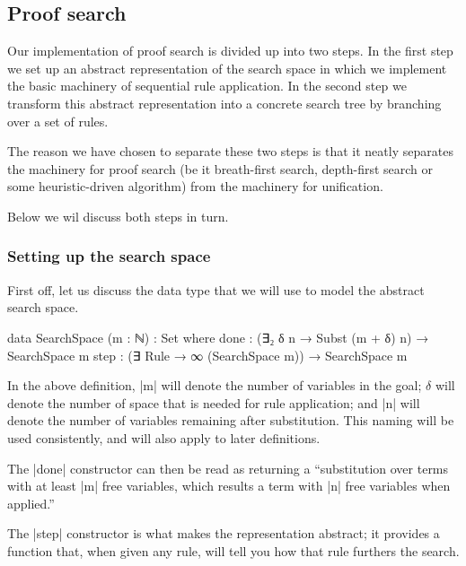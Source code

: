 \documentclass[preprint]{sigplanconf}
\begin{document}
\subsection{Proof search}

Our implementation of proof search is divided up into two steps.
In the first step we set up an abstract representation of the search
space in which we implement the basic machinery of sequential rule
application.
In the second step we transform this abstract representation into a
concrete search tree by branching over a set of rules.

The reason we have chosen to separate these two steps is that it
neatly separates the machinery for proof search (be it breath-first
search, depth-first search or some heuristic-driven algorithm) from
the machinery for unification.

Below we wil discuss both steps in turn.

\subsubsection*{Setting up the search space}

First off, let us discuss the data type that we will use to model the
abstract search space.

\begin{code}
  data SearchSpace (m : ℕ) : Set where
    done  : (∃₂ δ n → Subst (m + δ) n) → SearchSpace m
    step  : (∃ Rule → ∞ (SearchSpace m)) → SearchSpace m
\end{code}

In the above definition, |m| will denote the number of variables in
the goal; $\delta$ will denote the number of space that is needed for
rule application; and |n| will denote the number of variables
remaining after substitution. This naming will be used consistently,
and will also apply to later definitions.

The |done| constructor can then be read as returning a ``substitution
over terms with at least |m| free variables, which results a term with
|n| free variables when applied.''

The |step| constructor is what makes the representation abstract; it
provides a function that, when given any rule, will tell you how that
rule furthers the search.

\end{document}

